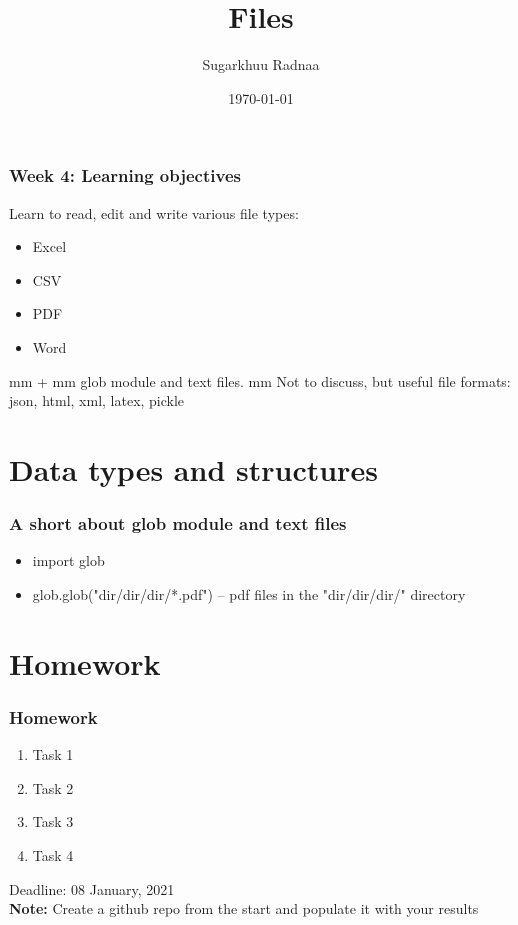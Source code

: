 \documentclass{beamer}
\title[Introduction to Python]{Files}
\author{Sugarkhuu Radnaa}
\institute[]
{
Py4Econ in Ulaanbaatar \\ 
\medskip
\textit{py4econ@gmail.com} 
}
\date{\today}  %
\begin{document}
\begin{frame}
\titlepage %
\end{frame}

\begin{frame}
    \frametitle{Week 4: Learning objectives}
Learn to read, edit and write various file types: 
    \begin{itemize}
        \item Excel
        \item CSV
        \item PDF 
        \item Word
    \end{itemize}
 mm
+
 mm
glob module and text files.
 mm
Not to discuss, but useful file formats: json, html, xml, latex, pickle

\end{frame}

\section{Data types and structures} 

\begin{frame}
    \frametitle{A short about glob module and text files}
            \begin{itemize}
                \item import glob
                \item glob.glob("dir/dir/dir/*.pdf") – pdf files in the "dir/dir/dir/" directory
                
            \end{itemize}
\end{frame}

\section{Homework} 

\begin{frame}
    \frametitle{Homework}
    \begin{enumerate}
        \item Task 1
        \item Task 2
        \item Task 3
        \item Task 4
    \end{enumerate}

\vskip 2mm
Deadline: 08 January, 2021 \\

\vfill
\textbf{Note:} Create a github repo from the start and populate it with your results
\end{frame}
\end{document}
